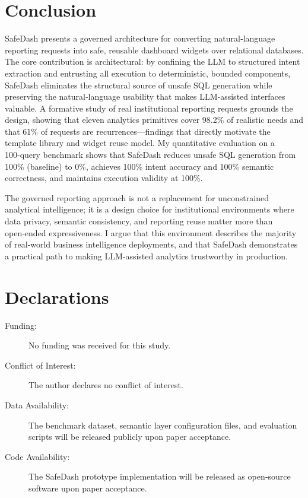\documentclass[11pt]{article}
\begin{document}
\section{Conclusion}
SafeDash presents a governed architecture for converting natural‑language reporting requests into safe, reusable dashboard widgets over relational databases. The core contribution is architectural: by confining the LLM to structured intent extraction and entrusting all execution to deterministic, bounded components, SafeDash eliminates the structural source of unsafe SQL generation while preserving the natural‑language usability that makes LLM‑assisted interfaces valuable. A formative study of real institutional reporting requests grounds the design, showing that eleven analytics primitives cover 98.2\% of realistic needs and that 61\% of requests are recurrences—findings that directly motivate the template library and widget reuse model. My quantitative evaluation on a 100‑query benchmark shows that SafeDash reduces unsafe SQL generation from 100\% (baseline) to 0\%, achieves 100\% intent accuracy and 100\% semantic correctness, and maintains execution validity at 100\%. 

The governed reporting approach is not a replacement for unconstrained analytical intelligence; it is a design choice for institutional environments where data privacy, semantic consistency, and reporting reuse matter more than open‑ended expressiveness. I argue that this environment describes the majority of real‑world business intelligence deployments, and that SafeDash demonstrates a practical path to making LLM‑assisted analytics trustworthy in production.

\section*{Declarations}
\begin{description}
\item[Funding:] No funding was received for this study.
\item[Conflict of Interest:] The author declares no conflict of interest.
\item[Data Availability:] The benchmark dataset, semantic layer configuration files, and evaluation scripts will be released publicly upon paper acceptance.
\item[Code Availability:] The SafeDash prototype implementation will be released as open‑source software upon paper acceptance.
\end{description}
\end{document}
